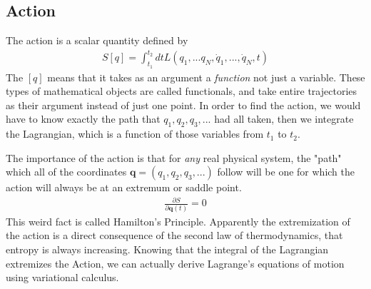 \subsection{Action}
\cite{dhoker_cm}The action is a scalar quantity defined by
\begin{align}
S[q] = \int_{t_1}^{t_2} dt L (q_1,...q_N, \dot{q}_1, ..., \dot{q}_N, t)
\end{align}
The $[q]$ means that it takes as an argument a \emph{function} not just a variable. These types of mathematical objects are called functionals, and take entire trajectories as their argument instead of just one point. In order to find the action, we would have to know exactly the path that $q_1, q_2, q_3, ...$ had all taken, then we integrate the Lagrangian, which is a function of those variables from $t_1$ to $t_2$. 



The importance of the action is that for \emph{any} real physical system, the "path" which all of the coordinates $\textbf{q} = (q_1,q_2,q_3,...)$ follow will be one for which the action will always be at an extremum or saddle point.
\begin{align}
    \frac{\partial S}{\partial \textbf{q}(t)} = 0
\end{align}
This weird fact is called Hamilton's Principle. Apparently the extremization of the action is a direct consequence of the second law of thermodynamics, that entropy is always increasing.\cite{stackexchange_action} Knowing that the integral of the Lagrangian extremizes the Action, we can actually derive Lagrange's equations of motion using variational calculus.

